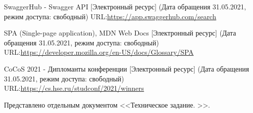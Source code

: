 \documentclass[a4paper,12pt,reqno]{article}
\begin{document}
\begin{thebibliography}{27}
		 SwaggerHub - Swagger API [Электронный ресурс] (Дата обращения 31.05.2021, режим доступа: свободный) URL:\url{https://app.swaggerhub.com/search}
		
		 SPA (Single-page application), MDN Web Docs [Электронный ресурс] (Дата обращения 31.05.2021, режим доступа: свободный) URL:\url{https://developer.mozilla.org/en-US/docs/Glossary/SPA}
		
		 CoCoS 2021 - Дипломанты конференции [Электронный ресурс] (Дата обращения 31.05.2021, режим доступа: свободный) URL:\url{https://cs.hse.ru/studconf/2021/winners}
	\end{thebibliography}

\newpage

Представлено отдельным документом <<Техническое задание. >>. 


	



\end{document}
